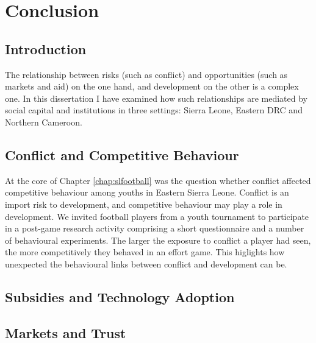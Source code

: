 \chapter{Conclusion}
\label{chap:conclusion}

\section{Introduction}
The relationship between risks (such as conflict) and opportunities (such as markets and aid) on the one hand, and development on the other is a complex one. In this dissertation I have examined how such relationships are mediated by social capital and institutions in three settings: Sierra Leone, Eastern DRC and Northern Cameroon.





\section{Conflict and Competitive Behaviour}

At the core of Chapter \ref{chap:slfootball} was the question whether conflict affected competitive behaviour among youths in Eastern Sierra Leone. Conflict is an import risk to development, and competitive behaviour may play a role in development. We invited football players from a youth tournament to participate in a post-game research activity comprising a short questionnaire and a number of behavioural experiments. The larger the exposure to conflict a player had seen, the more competitively they behaved in an effort game. This higlights how unexpected the behavioural links between conflict and development can be.



\section{Subsidies and Technology Adoption}

\section{Markets and Trust}

